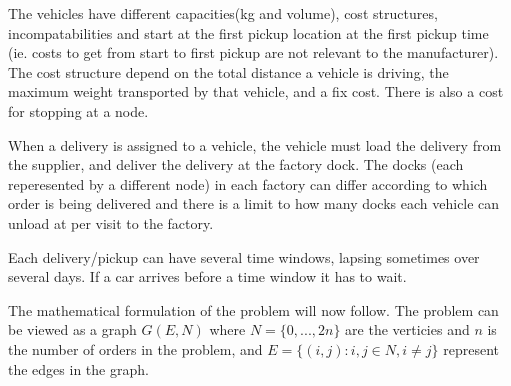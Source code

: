 \documentclass[a4paper,10pt]{article}
\begin{document}
The vehicles have different capacities(kg and volume), cost structures, incompatabilities and start at the first pickup location at the first pickup time (ie. costs to get from start to first pickup are not relevant to the manufacturer).
The cost structure depend on the total distance a vehicle is driving, the maximum weight transported by that vehicle, and a fix cost. There is also a cost for stopping at a node. \par
When a delivery is assigned to a vehicle, the vehicle must load the delivery from the supplier, and deliver the delivery at the factory dock.
The docks (each reperesented by a different node) in each factory can differ according to which order is being delivered and there is a limit to how many docks each vehicle can unload at per visit to the factory. \par
Each delivery/pickup can have several time windows, lapsing sometimes over several days. If a car arrives before a time window it has to wait. \par
The mathematical formulation of the problem will now follow. 
The problem can be viewed as a graph $G(E,N)$ where $N=\{0,...,2n\}$ are the verticies and $n$ is the number of orders in the problem, and $E=\{(i,j): i,j \in N, i \neq j\}$ represent the edges in the graph.
\linebreak
\end{document}
